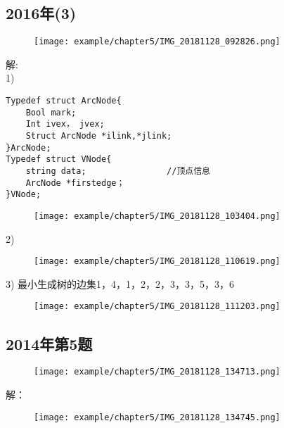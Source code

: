 \subsection{2016年(3)}
\begin{figure}[H]
\centering  %
\texttt{[image: example/chapter5/IMG\_20181128\_092826.png]}
\end{figure}
解:\newline
~\\
1)\newline
\begin{lstlisting}[basicstyle=\small\ttfamily, caption={}, numbers=none]
Typedef struct ArcNode{
	Bool mark;
	Int ivex， jvex;
	Struct ArcNode *ilink,*jlink;
}ArcNode;
Typedef struct VNode{
	string data;                //顶点信息
	ArcNode *firstedge；
}VNode;
\end{lstlisting}
\begin{figure}[H]
\centering  %
\texttt{[image: example/chapter5/IMG\_20181128\_103404.png]}
\end{figure}
2)\newline
\begin{figure}[H]
\centering  %
\texttt{[image: example/chapter5/IMG\_20181128\_110619.png]}
\end{figure}
3)\newline
最小生成树的边集{1，4}，{1，2}，{2，3}，{3，5}，{3，6} \newline
\begin{figure}[H]
\centering  %
\texttt{[image: example/chapter5/IMG\_20181128\_111203.png]}
\end{figure}

\subsection{2014年第5题}


\begin{figure}[H]
\centering  %
\texttt{[image: example/chapter5/IMG\_20181128\_134713.png]}
\end{figure}

解：\newline

\begin{figure}[H]
\centering  %
\texttt{[image: example/chapter5/IMG\_20181128\_134745.png]}
\end{figure}